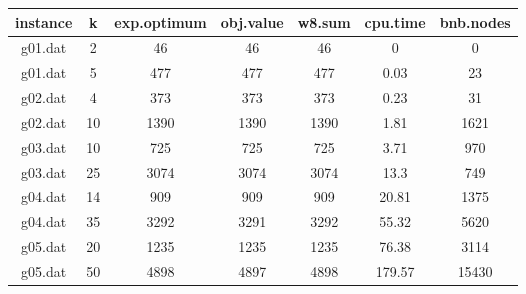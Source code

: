 \begin{tabular}{ c | c | c | c | c | c | c }
	instance & k & exp.optimum & obj.value & w8.sum & cpu.time & bnb.nodes \\ 
	\hline
	g01.dat & 2 & 46 & 46 & 46 & 0 & 0 \\
	g01.dat & 5 & 477 & 477 & 477 & 0.03 & 23 \\
	g02.dat & 4 & 373 & 373 & 373 & 0.23 & 31 \\
	g02.dat & 10 & 1390 & 1390 & 1390 & 1.81 & 1621 \\
	g03.dat & 10 & 725 & 725 & 725 & 3.71 & 970 \\
	g03.dat & 25 & 3074 & 3074 & 3074 & 13.3 & 749 \\
	g04.dat & 14 & 909 & 909 & 909 & 20.81 & 1375 \\
	g04.dat & 35 & 3292 & 3291 & 3292 & 55.32 & 5620 \\
	g05.dat & 20 & 1235 & 1235 & 1235 & 76.38 & 3114 \\
	g05.dat & 50 & 4898 & 4897 & 4898 & 179.57 & 15430 \\
\end{tabular}
